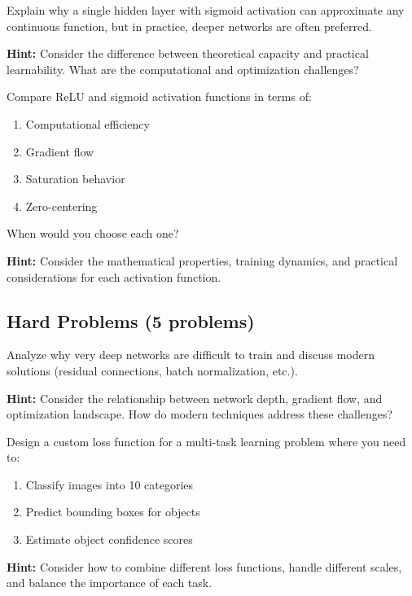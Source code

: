 \begin{problem}
\label{prob:universal-approx}

Explain why a single hidden layer with sigmoid activation can approximate any continuous function, but in practice, deeper networks are often preferred.

\textbf{Hint:} Consider the difference between theoretical capacity and practical learnability. What are the computational and optimization challenges?
\end{problem}

\begin{problem}
\label{prob:activation-comparison}

Compare ReLU and sigmoid activation functions in terms of:
\begin{enumerate}
    \item Computational efficiency
    \item Gradient flow
    \item Saturation behavior
    \item Zero-centering
\end{enumerate}

When would you choose each one?

\textbf{Hint:} Consider the mathematical properties, training dynamics, and practical considerations for each activation function.
\end{problem}

\subsection{Hard Problems (5 problems)}

\begin{problem}
\label{prob:deep-optimization}

Analyze why very deep networks are difficult to train and discuss modern solutions (residual connections, batch normalization, etc.).

\textbf{Hint:} Consider the relationship between network depth, gradient flow, and optimization landscape. How do modern techniques address these challenges?
\end{problem}

\begin{problem}
\label{prob:loss-design}

Design a custom loss function for a multi-task learning problem where you need to:
\begin{enumerate}
    \item Classify images into 10 categories
    \item Predict bounding boxes for objects
    \item Estimate object confidence scores
\end{enumerate}

\textbf{Hint:} Consider how to combine different loss functions, handle different scales, and balance the importance of each task.
\end{problem}

